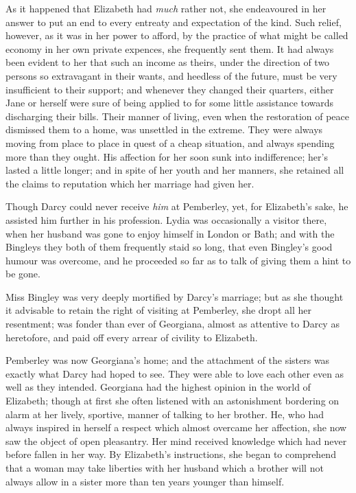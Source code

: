 As it happened that Elizabeth had \emph{much} rather not, she
endeavoured in her answer to put an end to every entreaty
and expectation of the kind.  Such relief, however, as it
was in her power to afford, by the practice of what might be
called economy in her own private expences, she frequently
sent them.  It had always been evident to her that such an
income as theirs, under the direction of two persons so
extravagant in their wants, and heedless of the future, must
be very insufficient to their support; and whenever they
changed their quarters, either Jane or herself were sure of
being applied to for some little assistance towards discharging
their bills.  Their manner of living, even when the restoration
of peace dismissed them to a home, was unsettled in the
extreme.  They were always moving from place to place in quest
of a cheap situation, and always spending more than they ought.
His affection for her soon sunk into indifference; her's lasted
a little longer; and in spite of her youth and her manners, she
retained all the claims to reputation which her marriage had
given her.

Though Darcy could never receive \emph{him} at Pemberley, yet, for
Elizabeth's sake, he assisted him further in his profession.
Lydia was occasionally a visitor there, when her husband was
gone to enjoy himself in London or Bath; and with the Bingleys
they both of them frequently staid so long, that even Bingley's
good humour was overcome, and he proceeded so far as to talk
of giving them a hint to be gone.

Miss Bingley was very deeply mortified by Darcy's marriage; but
as she thought it advisable to retain the right of visiting at
Pemberley, she dropt all her resentment; was fonder than ever
of Georgiana, almost as attentive to Darcy as heretofore, and
paid off every arrear of civility to Elizabeth.

Pemberley was now Georgiana's home; and the attachment of the
sisters was exactly what Darcy had hoped to see.  They were able
to love each other even as well as they intended.  Georgiana had
the highest opinion in the world of Elizabeth; though at first
she often listened with an astonishment bordering on alarm at
her lively, sportive, manner of talking to her brother.  He, who
had always inspired in herself a respect which almost overcame
her affection, she now saw the object of open pleasantry.  Her
mind received knowledge which had never before fallen in her way.
By Elizabeth's instructions, she began to comprehend that a woman
may take liberties with her husband which a brother will not
always allow in a sister more than ten years younger than himself.

